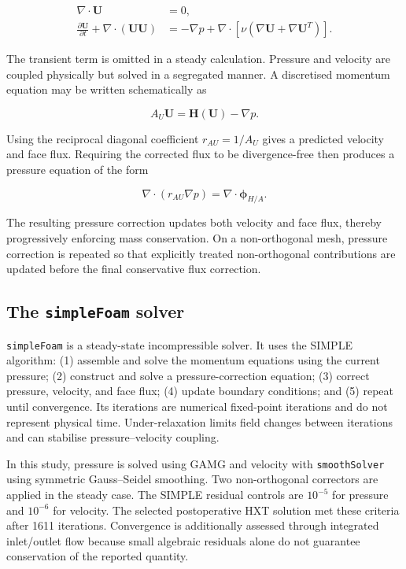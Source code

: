 \documentclass[11pt,a4paper]{article}
\begin{document}
\begin{align}
  \nabla\cdot\mathbf{U} &= 0, \\
  \frac{\partial\mathbf{U}}{\partial t}
  +\nabla\cdot(\mathbf{U}\mathbf{U})
  &= -\nabla p
     +\nabla\cdot\left[\nu\left(\nabla\mathbf{U}
     +\nabla\mathbf{U}^{T}\right)\right].
\end{align}

The transient term is omitted in a steady calculation. Pressure and velocity
are coupled physically but solved in a segregated manner. A discretised
momentum equation may be written schematically as

\begin{equation}
  A_U\mathbf{U}=\mathbf{H}(\mathbf{U})-\nabla p.
\end{equation}

Using the reciprocal diagonal coefficient $r_{AU}=1/A_U$ gives a predicted
velocity and face flux. Requiring the corrected flux to be divergence-free
then produces a pressure equation of the form

\begin{equation}
  \nabla\cdot\left(r_{AU}\nabla p\right)
  =\nabla\cdot\boldsymbol{\phi}_{H/A}.
\end{equation}

The resulting pressure correction updates both velocity and face flux, thereby
progressively enforcing mass conservation. On a non-orthogonal mesh, pressure
correction is repeated so that explicitly treated non-orthogonal contributions
are updated before the final conservative flux correction.

\subsection{The \texttt{simpleFoam} solver}

\texttt{simpleFoam} is a steady-state incompressible solver. It uses the SIMPLE
algorithm: (1) assemble and solve the momentum equations using the current
pressure; (2) construct and solve a pressure-correction equation; (3) correct
pressure, velocity, and face flux; (4) update boundary conditions; and (5)
repeat until convergence. Its iterations are numerical fixed-point iterations
and do not represent physical time. Under-relaxation limits field changes
between iterations and can stabilise pressure--velocity coupling.

In this study, pressure is solved using GAMG and velocity with
\texttt{smoothSolver} using symmetric Gauss--Seidel smoothing. Two
non-orthogonal correctors are applied in the steady case. The SIMPLE residual
controls are $10^{-5}$ for pressure and $10^{-6}$ for velocity. The selected postoperative HXT solution met these criteria after 1611
iterations. Convergence
is additionally assessed through integrated inlet/outlet flow because small
algebraic residuals alone do not guarantee conservation of the reported
quantity.
\end{document}
